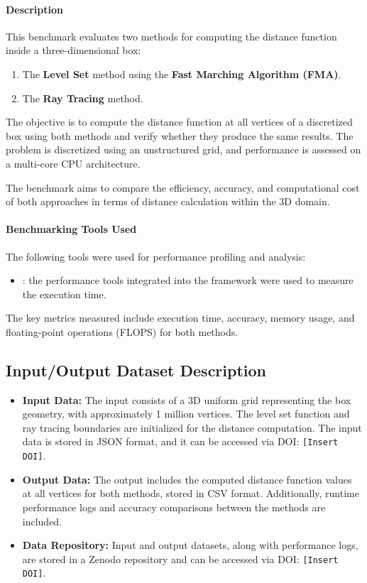 \paragraph{Description}
This benchmark evaluates two methods for computing the distance function inside a three-dimensional box:
\begin{enumerate}
    \item The \textbf{Level Set} method using the \textbf{Fast Marching Algorithm (FMA)}.
    \item The \textbf{Ray Tracing} method.
\end{enumerate}
The objective is to compute the distance function at all vertices of a discretized box using both methods and verify whether they produce the same results.
The problem is discretized using an unstructured grid, and performance is assessed on a multi-core CPU architecture.

The benchmark aims to compare the efficiency, accuracy, and computational cost of both approaches in terms of distance calculation within the 3D domain.

\paragraph{Benchmarking Tools Used}
The following tools were used for performance profiling and analysis:
\begin{itemize}
\item \textbf{\Feelpp}: the performance tools integrated into the \Feelpp framework were used to measure the execution time.
\end{itemize}

The key metrics measured include execution time, accuracy, memory usage, and floating-point operations (FLOPS) for both methods.

\subsection{Input/Output Dataset Description}
\begin{itemize}
    \item \textbf{Input Data:} The input consists of a 3D uniform grid representing the box geometry, with approximately 1 million vertices. The level set function and ray tracing boundaries are initialized for the distance computation. The input data is stored in JSON format, and it can be accessed via DOI: \texttt{[Insert DOI]}.

    \item \textbf{Output Data:} The output includes the computed distance function values at all vertices for both methods, stored in CSV format. Additionally, runtime performance logs and accuracy comparisons between the methods are included.

    \item \textbf{Data Repository:} Input and output datasets, along with performance logs, are stored in a Zenodo repository and can be accessed via DOI: \texttt{[Insert DOI]}.
\end{itemize}

